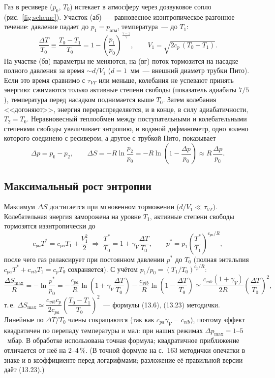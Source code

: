 \documentclass[12pt,a4paper]{article}
\newcommand{\dSmax}{\Delta S_{\max}}
\begin{document}
Газ в ресивере ($p_0$, $T_0$) истекает в атмосферу через дозвуковое
сопло (рис.~\ref{fig:scheme}). Участок (аб)~--- равновесное
изэнтропическое разгонное течение: давление падает до
$p_1 = p_{\text{атм}}$, температура~--- до $T_1$:
\begin{equation}
    \frac{\Delta T}{T_0} \equiv \frac{T_0-T_1}{T_0} = 1-\left(\frac{p_1}{p_0}\right)^{\frac{\gamma-1}{\gamma}},
    \qquad
    V_1 = \sqrt{2c_p\,(T_0-T_1)}.
    \label{eq:V1}
\end{equation}
На участке (бв) параметры не меняются, на (вг) поток тормозится на
насадке полного давления за время $\sim d/V_1$ ($d = 1$~мм~---
внешний диаметр трубки Пито). Если это время сравнимо с $\tau_{VT}$
или меньше, колебания не успевают принять энергию: сжимаются только
активные степени свободы (показатель адиабаты $7/5$), температура
перед насадком поднимается выше $T_0$. Затем колебания
<<догоняют>>, энергия перераспределяется, и в конце, в силу
адиабатичности, $T_2 = T_0$. Неравновесный теплообмен между
поступательными и колебательными степенями свободы увеличивает
энтропию, и водяной дифманометр, одно колено которого соединено с
ресивером, а другое с трубкой Пито, показывает
\begin{equation}
    \Delta p = p_0 - p_2,
    \qquad
    \Delta S = -R\ln\frac{p_2}{p_0} = -R\ln\left(1-\frac{\Delta p}{p_0}\right) \approx R\,\frac{\Delta p}{p_0}.
    \label{eq:dS}
\end{equation}

\subsection{Максимальный рост энтропии}\label{sec:dSmax}

Максимум $\Delta S$ достигается при мгновенном торможении
($d/V_1 \ll \tau_{VT}$). Колебательная энергия заморожена на уровне
$T_1$, активные степени свободы тормозятся изэнтропически до
\[
    c_{pa}T^* = c_{pa}T_1 + \frac{V_1^2}{2}
    \;\Rightarrow\;
    \frac{T^*}{T_0} = 1 + \gamma_V\frac{\Delta T}{T_0},
    \qquad
    p^* = p_1\left(\frac{T^*}{T_1}\right)^{c_{pa}/R},
\]
после чего газ релаксирует при постоянном давлении $p^*$ до
$T_0$ (полная энтальпия $c_{pa}T^* + c_{vib}T_1 = c_pT_0$ сохраняется).
С учётом $p_1/p_0 = (T_1/T_0)^{c_p/R}$:
\begin{equation}
    \frac{\dSmax}{R} = -\ln\frac{p^*}{p_0}
    = -\frac{c_{pa}}{R}\ln\!\left(1+\gamma_V\frac{\Delta T}{T_0}\right)
      -\frac{c_{vib}}{R}\ln\!\left(1-\frac{\Delta T}{T_0}\right)
    \simeq \frac{c_{vib}(1+\gamma_V)}{2R}\left(\frac{\Delta T}{T_0}\right)^2,
    \label{eq:dSmax}
\end{equation}
т.\,е. $\dSmax \simeq \dfrac{c_{vib}c_p}{2c_{pa}}\left(\dfrac{T_0-T_1}{T_0}\right)^2$~---
формулы (13.6), (13.23) методички. Линейные по $\Delta T/T_0$ члены
сокращаются (так как $c_{pa}\gamma_V = c_{vib}$), поэтому эффект
квадратичен по перепаду температуры и мал: при наших режимах
$\Delta p_{\max} = 1\text{--}5$~мбар. В обработке использована точная
формула; квадратичное приближение отличается от неё на 2--4\,\%.
(В точной формуле на с.~163 методички опечатки в знаке и в
коэффициенте перед логарифмами; разложение её правильной версии даёт
(13.23).)
\end{document}
